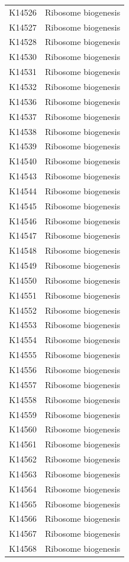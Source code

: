\begin{longtable}{@{}l l@{}}
K14526 & Ribosome biogenesis \\
K14527 & Ribosome biogenesis \\
K14528 & Ribosome biogenesis \\
K14530 & Ribosome biogenesis \\
K14531 & Ribosome biogenesis \\
K14532 & Ribosome biogenesis \\
K14536 & Ribosome biogenesis \\
K14537 & Ribosome biogenesis \\
K14538 & Ribosome biogenesis \\
K14539 & Ribosome biogenesis \\
K14540 & Ribosome biogenesis \\
K14543 & Ribosome biogenesis \\
K14544 & Ribosome biogenesis \\
K14545 & Ribosome biogenesis \\
K14546 & Ribosome biogenesis \\
K14547 & Ribosome biogenesis \\
K14548 & Ribosome biogenesis \\
K14549 & Ribosome biogenesis \\
K14550 & Ribosome biogenesis \\
K14551 & Ribosome biogenesis \\
K14552 & Ribosome biogenesis \\
K14553 & Ribosome biogenesis \\
K14554 & Ribosome biogenesis \\
K14555 & Ribosome biogenesis \\
K14556 & Ribosome biogenesis \\
K14557 & Ribosome biogenesis \\
K14558 & Ribosome biogenesis \\
K14559 & Ribosome biogenesis \\
K14560 & Ribosome biogenesis \\
K14561 & Ribosome biogenesis \\
K14562 & Ribosome biogenesis \\
K14563 & Ribosome biogenesis \\
K14564 & Ribosome biogenesis \\
K14565 & Ribosome biogenesis \\
K14566 & Ribosome biogenesis \\
K14567 & Ribosome biogenesis \\
K14568 & Ribosome biogenesis \\

\end{longtable}
